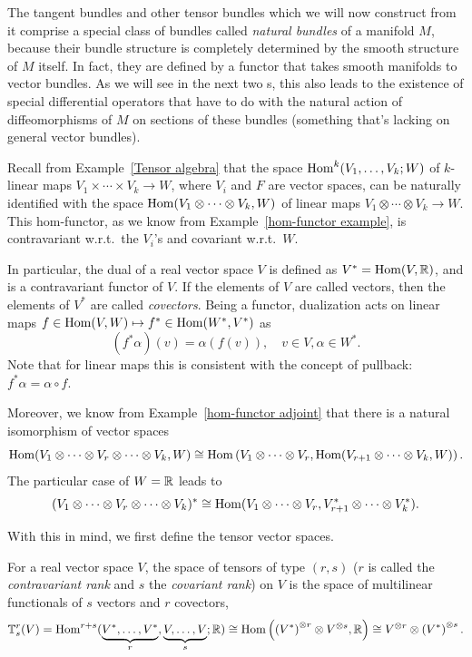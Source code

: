 The tangent bundles and other tensor bundles which we will now construct from it comprise a special class of bundles called \emph{natural bundles} of a manifold $M$, because their bundle structure is completely determined by the smooth structure of $M$ itself. In fact, they are defined by a functor that takes smooth manifolds to vector bundles. As we will see in the next two \sect s, this also leads to the existence of special differential operators that have to do with the natural action of diffeomorphisms of $M$ on sections of these bundles (something that's lacking on general vector bundles).


Recall from Example~\ref{Tensor algebra} that the space $\operatorname{Hom}^k(V_1,\ldots,V_k;W)$ of $k$-linear maps $V_1\times \cdots\times V_k\to W$, where $V_i$ and $F$ are vector spaces, can be naturally identified with the space $\operatorname{Hom}(V_1\otimes\cdots\otimes V_k,W)$ of linear maps $V_1\otimes \cdots\otimes V_k\to W$. This hom-functor, as we know from Example~\ref{hom-functor example}, is contravariant w.r.t.\ the $V_i$'s and covariant w.r.t.\ $W$. 

In particular, the dual of a real vector space $V$ is defined as $V^\ast=\operatorname{Hom}(V,\mathbb{R} )$, and is a contravariant functor of $V$. If the elements of $V$ are called vectors, then the elements of $V^\ast$ are called \emph{covectors}. Being a functor, dualization acts on linear maps $f\in\operatorname{Hom}(V,W)\mapsto f^\ast\in \operatorname{Hom}(W^\ast,V^\ast)$ as 
\[(f^\ast\alpha)(v)=\alpha(f(v)), \quad v\in V, \alpha\in W^\ast.\] 
Note that for linear maps this is consistent with the concept of pullback: $f^\ast\alpha=\alpha\circ f$.

Moreover, we know from Example~\ref{hom-functor adjoint} that there is a natural isomorphism of vector spaces
\[
\operatorname{Hom}(V_1\otimes\cdots\otimes V_r\otimes\cdots\otimes V_k,W)\cong\operatorname{Hom}\left(V_1\otimes\cdots\otimes V_r,\operatorname{Hom}(V_{r+1}\otimes\cdots\otimes V_k,W)\right).
\]
The particular case of $W=\mathbb{R} $ leads to 
\[
(V_1\otimes\cdots\otimes V_r\otimes\cdots\otimes V_k)^\ast\cong\operatorname{Hom}(V_1\otimes\cdots\otimes V_r,V_{r+1}^\ast\otimes\cdots\otimes V_k^\ast).
\]

With this in mind, we first define the tensor vector spaces.

\begin{defn}[Tensors]
    For a real vector space $V$, the space of tensors of type $(r,s)$ ($r$ is called the \emph{contravariant rank} and $s$ the \emph{covariant rank}) on $V$ is the space of multilinear functionals of $s$ vectors and $r$ covectors, \[\mathbb{T}^r_s(V)=\operatorname{Hom}^{r+s}(\underbrace{V^\ast,\ldots,V^\ast}_{r},\underbrace{V,\ldots,V}_s;\mathbb{R} )\cong\operatorname{Hom} \left(\left(V^\ast\right)^{\otimes r}\otimes V^{\otimes s},\mathbb{R} \right)\cong V^{\otimes r}\otimes \left(V^\ast\right)^{\otimes s}.\]
\end{defn}

